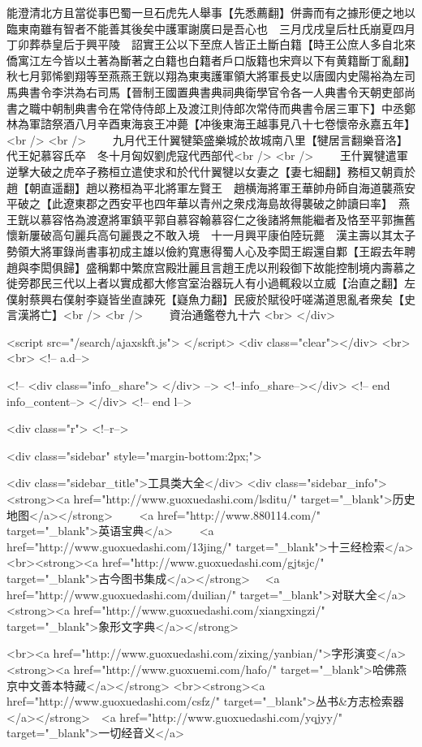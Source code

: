 能澄清北方且當從事巴蜀一旦石虎先人舉事【先悉薦翻】併壽而有之據形便之地以臨東南雖有智者不能善其後矣中護軍謝廣曰是吾心也　三月戊戌皇后杜氏崩夏四月丁卯葬恭皇后于興平陵　詔實王公以下至庶人皆正土斷白籍【時王公庶人多自北來僑寓江左今皆以土著為斷著之白籍也白籍者戶口版籍也宋齊以下有黄籍斷丁亂翻】秋七月郭悕劉翔等至燕燕王皝以翔為東夷護軍領大將軍長史以唐國内史陽裕為左司馬典書令李洪為右司馬【晉制王國置典書典祠典衛學官令各一人典書令天朝吏部尚書之職中朝制典書令在常侍侍郎上及渡江則侍郎次常侍而典書令居三軍下】中丞鄭林為軍諮祭酒八月辛酉東海哀王冲薨【冲後東海王越事見八十七卷懷帝永嘉五年】<br />
<br />
　　九月代王什翼犍築盛樂城於故城南八里【犍居言翻樂音洛】代王妃慕容氏卒　冬十月匈奴劉虎寇代西部代<br />
<br />
　　王什翼犍遣軍逆擊大破之虎卒子務桓立遣使求和於代什翼犍以女妻之【妻七細翻】務桓又朝貢於趙【朝直遥翻】趙以務桓為平北將軍左賢王　趙横海將軍王華帥舟師自海道襲燕安平破之【此遼東郡之西安平也四年華以青州之衆戍海島故得襲破之帥讀曰率】　燕王皝以慕容恪為渡遼將軍鎮平郭自慕容翰慕容仁之後諸將無能繼者及恪至平郭撫舊懷新屢破高句麗兵高句麗畏之不敢入境　十一月興平康伯陸玩薨　漢主壽以其太子勢領大將軍錄尚書事初成主雄以儉約寬惠得蜀人心及李閎王嘏還自鄴【王嘏去年聘趙與李閎俱歸】盛稱鄴中繁庶宫殿壯麗且言趙王虎以刑殺御下故能控制境内壽慕之徙旁郡民三代以上者以實成都大修宫室治器玩人有小過輒殺以立威【治直之翻】左僕射蔡興右僕射李嶷皆坐直諫死【嶷魚力翻】民疲於賦役吁嗟滿道思亂者衆矣【史言漢將亡】<br />
<br />
　　資治通鑑卷九十六  <br>
   </div> 

<script src="/search/ajaxskft.js"> </script>
 <div class="clear"></div>
<br>
<br>
 <!-- a.d-->

 <!--
<div class="info_share">
</div> 
-->
 <!--info_share--></div>   <!-- end info_content-->
  </div> <!-- end l-->

<div class="r">   <!--r-->



<div class="sidebar"  style="margin-bottom:2px;">

 
<div class="sidebar_title">工具类大全</div>
<div class="sidebar_info">
<strong><a href="http://www.guoxuedashi.com/lsditu/" target="_blank">历史地图</a></strong>　　
<a href="http://www.880114.com/" target="_blank">英语宝典</a>　　
<a href="http://www.guoxuedashi.com/13jing/" target="_blank">十三经检索</a>　
<br><strong><a href="http://www.guoxuedashi.com/gjtsjc/" target="_blank">古今图书集成</a></strong>　
<a href="http://www.guoxuedashi.com/duilian/" target="_blank">对联大全</a>　<strong><a href="http://www.guoxuedashi.com/xiangxingzi/" target="_blank">象形文字典</a></strong>　

<br><a href="http://www.guoxuedashi.com/zixing/yanbian/">字形演变</a>　　<strong><a href="http://www.guoxuemi.com/hafo/" target="_blank">哈佛燕京中文善本特藏</a></strong>
<br><strong><a href="http://www.guoxuedashi.com/csfz/" target="_blank">丛书&方志检索器</a></strong>　<a href="http://www.guoxuedashi.com/yqjyy/" target="_blank">一切经音义</a>　　

